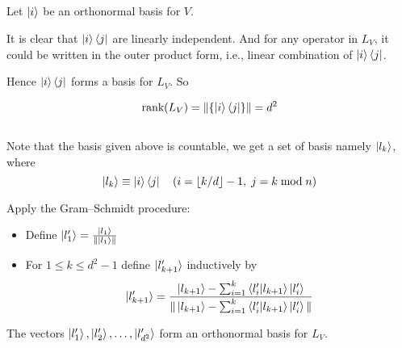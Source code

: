 \documentclass{homeworg}
\begin{document}
\subsection{}
Let $\ket{i}$ be an orthonormal basis for $V$.

It is clear that $\ket{i}\bra{j}$ are linearly independent. And for any operator in $L_V$,
it could be written in the outer product form, i.e., linear combination of $\ket{i}\bra{j}$.

Hence $\ket{i}\bra{j}$ forms a basis for $L_V$. So

\[\text{rank}(L_V)=\|\{\ket{i}\bra{j}\}\|=d^2\]
\subsection{}
Note that the basis given above is countable, we get a set of basis namely $\ket{l_k}$, where 
\[\ket{l_k}\equiv\ket{i}\bra{j}\quad(i=\lfloor k / d \rfloor -1,\;j = k\;\text{mod}\;n)\]

Apply the Gram–Schmidt procedure:

\begin{itemize}
    \item Define $\ket{l_1^\prime}=\frac{\ket{l_1}}{\|\ket{l_1}\|}$
    \item For $1\leq k \leq d^2 -1$ define $\ket{l_{k+1}^\prime}$ inductively by
    \[\ket{l_{k+1}^\prime}=\frac{\ket{l_{k+1}}-\sum_{i=1}^k\braket{l_i^\prime|l_{k+1}}\ket{l_i^\prime}}{\|\ket{l_{k+1}}-\sum_{i=1}^k\braket{l_i^\prime|l_{k+1}}\ket{l_i^\prime}\|}\]
\end{itemize}

The vectors $\ket{l_1^\prime},\ket{l_2^\prime},\dots,\ket{l_{d^2}^\prime}$ form an orthonormal basis for $L_V$. 
\end{document}
